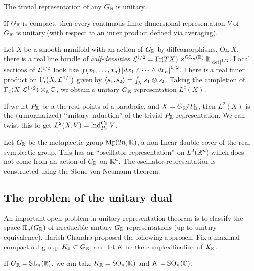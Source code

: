 \documentclass{article}
\begin{document}
\begin{ex}
	The trivial representation of any $G_{\mathbb{R}}$ is unitary.
\end{ex}

\begin{ex}
	If $G_{\mathbb{R}}$ is compact, then every continuous finite-dimensional representation $V$ of $G_{\mathbb{R}}$ is unitary (with respect to an inner product defined via averaging).
\end{ex}

\begin{ex}
	Let $X$ be a smooth manifold with an action of $G_{\mathbb{R}}$ by diffeomorphisms.
	On $X$, there is a real line bundle of \emph{half-densities} $\mathcal{L}^{1/2} = \operatorname{Fr}(TX) \times^{\operatorname{GL}_n(\mathbb{R})} \mathbb{R}_{\left|\det\right|^{1/2}}$.
	Local sections of $\mathcal{L}^{1/2}$ look like $f(x_1, \dots, x_n) \left|dx_1 \wedge \dots \wedge dx_n\right|^{1/2}$.
	There is a real inner product on $\Gamma_c(X, \mathcal{L}^{1/2})$ given by $\left\langle s_1, s_2 \right\rangle = \int_X s_1 \otimes s_2$.
	Taking the completion of $\Gamma_c(X, \mathcal{L}^{1/2}) \otimes_{\mathbb{R}} \mathbb{C}$, we obtain a unitary $G_{\mathbb{R}}$-representation $L^2(X)$.

	If we let $P_{\mathbb{R}}$ be a the real points of a parabolic, and $X = G_{\mathbb{R}} / P_{\mathbb{R}}$, then $L^2(X)$ is the (unnormalized) ``unitary induction'' of the trivial $P_{\mathbb{R}}$-representation.
	We can twist this to get $L^2(X, V) = \operatorname{Ind}_{P_{\mathbb{R}}}^{G_{\mathbb{R}}} V$.
\end{ex}

\begin{ex}
	Let $G_{\mathbb{R}}$ be the metaplectic group $\operatorname{Mp}(2n, \mathbb{R})$, a non-linear double cover of the real symplectic group.
	This has an ``oscillator representation'' on $L^2(\mathbb{R}^n)$ which does not come from an action of $G_{\mathbb{R}}$ on $\mathbb{R}^n$.
	The oscillator representation is constructed using the Stone-von Neumann theorem.
\end{ex}

\subsection{The problem of the unitary dual}

An important open problem in unitary representation theorem is to classify the space $\Pi_u(G_{\mathbb{R}})$ of irreducible unitary $G_{\mathbb{R}}$-representations (up to unitary equivalence).
Harish-Chandra proposed the following approach.
Fix a maximal compact subgroup $K_{\mathbb{R}} \subset G_{\mathbb{R}}$, and let $K$ be the complexification of $K_{\mathbb{R}}$.

\begin{ex}
	If $G_{\mathbb{R}} = \operatorname{SL}_n(\mathbb{R})$, we can take $K_{\mathbb{R}} = \operatorname{SO}_n(\mathbb{R})$ and $K = \operatorname{SO}_n(\mathbb{C})$.
\end{ex}
\end{document}
